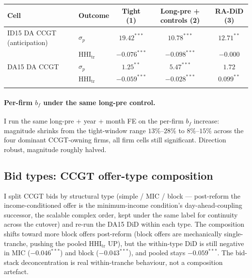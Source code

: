 \documentclass[11pt,a4paper]{article}
\theoremstyle{definition}
\theoremstyle{remark}
\theoremstyle{plain}
\begin{document}
\begin{center}
\footnotesize
\setlength{\tabcolsep}{6pt}
\begin{tabular}{l l c c c}
\toprule
\textbf{Cell}                       & \textbf{Outcome} & \textbf{Tight (1)} & \textbf{Long-pre + controls (2)} & \textbf{RA-DiD (3)} \\
\midrule
ID15 DA CCGT (anticipation)         & $\sigma_p$       & $19.42^{***}$ & $10.78^{***}$ & $12.71^{**}$ \\
                                    & $\text{HHI}_{\text{tr}}$   & $-0.076^{***}$ & $-0.098^{***}$ & $-0.000$ \\
\addlinespace
DA15 DA CCGT                        & $\sigma_p$       & $1.25^{**}$   & $5.47^{***}$  & $1.72$ \\
                                    & $\text{HHI}_{\text{tr}}$   & $-0.059^{***}$ & $-0.028^{***}$ & $0.099^{**}$ \\
\addlinespace
\bottomrule
\end{tabular}
\label{tab:spec-c-longpre-ra}
\end{center}

\paragraph{Per-firm $b_f$ under the same long-pre control.} I run the same long-pre + year + month FE on the per-firm $b_f$ increase: magnitude shrinks from the tight-window range $13$\%--$28$\% to $8$\%--$15$\% across the four dominant CCGT-owning firms, all firm cells still significant. Direction robust, magnitude roughly halved.

\subsection{Bid types: CCGT offer-type composition}\label{sec:5-offertype}
I split CCGT bids by structural type (simple / MIC / block --- post-reform the income-conditioned offer is the minimum-income condition's day-ahead-coupling successor, the scalable complex order, kept under the same label for continuity across the cutover) and re-run the DA15 DiD within each type. The composition shifts toward more block offers post-reform (block offers are mechanically single-tranche, pushing the pooled $\text{HHI}_{\text{tr}}$ UP), but the within-type DiD is still negative in MIC ($-0.046^{***}$) and block ($-0.043^{***}$), and pooled stays $-0.059^{***}$. The bid-stack deconcentration is real within-tranche behaviour, not a composition artefact.
\end{document}
